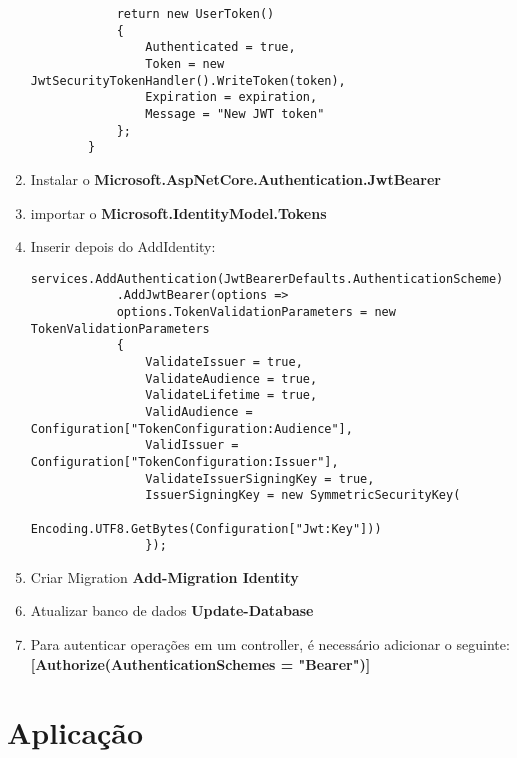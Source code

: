 \documentclass{article}
\begin{document}
\begin{enumerate}
\begin{verbatim}
            return new UserToken()
            {
                Authenticated = true,
                Token = new JwtSecurityTokenHandler().WriteToken(token),
                Expiration = expiration,
                Message = "New JWT token"
            };
        }
    \end{verbatim}
    
    \item Instalar o \textbf{Microsoft.AspNetCore.Authentication.JwtBearer}
    
    \item importar o \textbf{Microsoft.IdentityModel.Tokens}
    
    \item Inserir depois do AddIdentity:
    
    \begin{verbatim}
services.AddAuthentication(JwtBearerDefaults.AuthenticationScheme)
            .AddJwtBearer(options =>
            options.TokenValidationParameters = new TokenValidationParameters
            {
                ValidateIssuer = true,
                ValidateAudience = true,
                ValidateLifetime = true,
                ValidAudience = Configuration["TokenConfiguration:Audience"],
                ValidIssuer = Configuration["TokenConfiguration:Issuer"],
                ValidateIssuerSigningKey = true,
                IssuerSigningKey = new SymmetricSecurityKey(
                    Encoding.UTF8.GetBytes(Configuration["Jwt:Key"]))
                });
    \end{verbatim}
    
    \item Criar Migration \textbf{Add-Migration Identity}
    
    \item Atualizar banco de dados \textbf{Update-Database}
    
    \item Para autenticar operações em um controller, é necessário adicionar o seguinte: \\
    \textbf{
        [Authorize(AuthenticationSchemes = "Bearer")]}
\end{enumerate}

\section{Aplicação}
\end{document}
